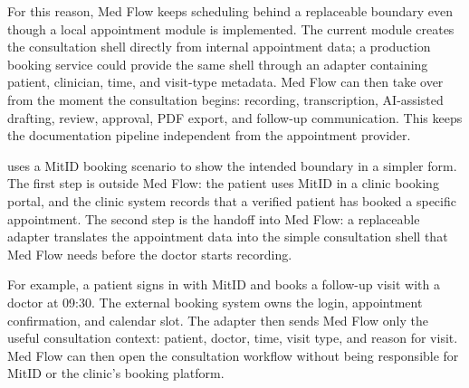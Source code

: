 For this reason, Med Flow keeps scheduling behind a replaceable boundary even though a local appointment module is implemented. The current module creates the consultation shell directly from internal appointment data; a production booking service could provide the same shell through an adapter containing patient, clinician, time, and visit-type metadata. Med Flow can then take over from the moment the consultation begins: recording, transcription, AI-assisted drafting, review, approval, PDF export, and follow-up communication. This keeps the documentation pipeline independent from the appointment provider.

 uses a MitID booking scenario to show the intended boundary in a simpler form. The first step is outside Med Flow: the patient uses MitID in a clinic booking portal, and the clinic system records that a verified patient has booked a specific appointment. The second step is the handoff into Med Flow: a replaceable adapter translates the appointment data into the simple consultation shell that Med Flow needs before the doctor starts recording.

For example, a patient signs in with MitID and books a follow-up visit with a doctor at 09:30. The external booking system owns the login, appointment confirmation, and calendar slot. The adapter then sends Med Flow only the useful consultation context: patient, doctor, time, visit type, and reason for visit. Med Flow can then open the consultation workflow without being responsible for MitID or the clinic's booking platform.

